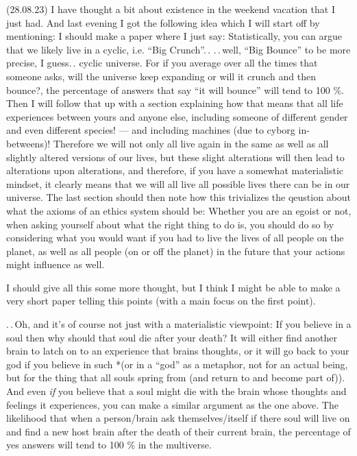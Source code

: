 \documentclass{report}
\begin{document}
(28.08.23) I have thought a bit about existence in the weekend vacation that I just had. And last evening I got the following idea which I will start off by mentioning: I should make a paper where I just say: Statistically, you can argue that we likely live in a cyclic, i.e. ``Big Crunch''.\,. .\,.\,well, ``Big Bounce'' to be more precise, I guess.\,. cyclic universe. For if you average over all the times that someone asks, will the universe keep expanding or will it crunch and then bounce?, the percentage of answers that say ``it will bounce'' will tend to 100 \%. Then I will follow that up with a section explaining how that means that all life experiences between yours and anyone else, including someone of different gender and even different species! --- and including machines (due to cyborg in-betweens)! Therefore we will not only all live again in the same as well as all slightly altered versions of our lives, but these slight alterations will then lead to alterations upon alterations, and therefore, if you have a somewhat materialistic mindset, it clearly means that we will all live all possible lives there can be in our universe. The last section should then note how this trivializes the qeustion about what the axioms of an ethics system should be: Whether you are an egoist or not, when asking yourself about what the right thing to do is, you should do so by considering what you would want if you had to live the lives of all people on the planet, as well as all people (on or off the planet) in the future that your actions might influence as well.

I should give all this some more thought, but I think I might be able to make a very short paper telling this points (with a main focus on the first point).

.\,.\,Oh, and it's of course not just with a materialistic viewpoint: If you believe in a soul then why should that soul die after your death? It will either find another brain to latch on to an experience that brains thoughts, or it will go back to your god if you believe in such *(or in a ``god'' as a metaphor, not for an actual being, but for the thing that all souls spring from (and return to and become part of)). And even \emph{if} you believe that a soul might die with the brain whose thoughts and feelings it experiences, you can make a similar argument as the one above. The likelihood that when a person/brain ask themselves/itself if there soul will live on and find a new host brain after the death of their current brain, the percentage of yes answers will tend to 100 \% in the multiverse.
\end{document}
